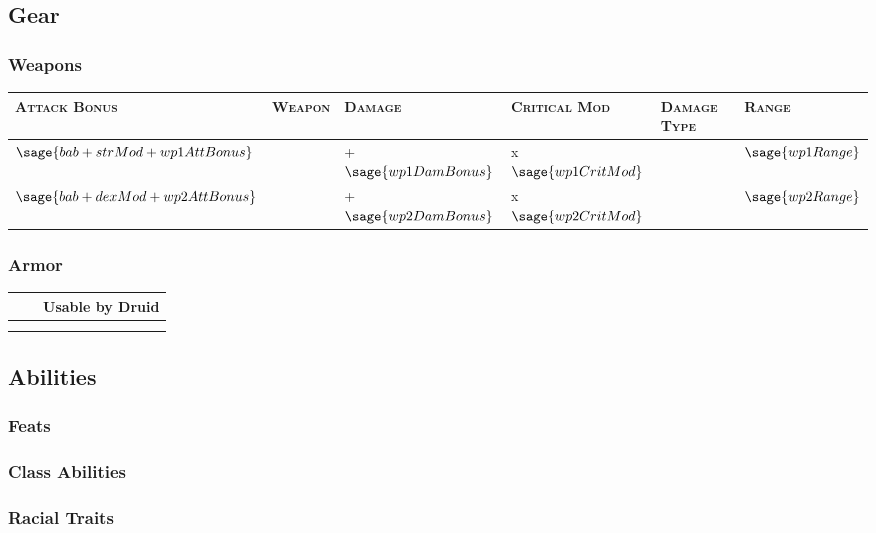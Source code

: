 \documentclass[10pt]{article}
\begin{document}
\subsection*{Gear}
	\subsubsection*{Weapons}
		\begin{tabularx}{\textwidth}{| X | X | X | X | X | X |}
			\hline
			\textsc{Attack Bonus} & \textsc{Weapon} & \textsc{Damage} & \textsc{Critical Mod} & \textsc{Damage Type} & \textsc{Range} \\ 
			\hline
			\(\sage{bab+strMod+wp1AttBonus}\) & \wpOneName & \wpOneDam+\(\sage{wp1DamBonus}\) & x\(\sage{wp1CritMod}\)  & \wpOneType & \(\sage{wp1Range}\) \\
			\hline
			\(\sage{bab+dexMod+wp2AttBonus}\) & \wpTwoName & \wpTwoDam+\(\sage{wp2DamBonus}\) & x\(\sage{wp2CritMod}\) & \wpTwoType & \(\sage{wp2Range}\) \\
			\hline
		\end{tabularx}
	\subsubsection*{Armor}
		\begin{tabularx}{\textwidth}{| X | X | X |}
			\hline
			\armOneName & \armOneBonus & Usable by Druid \\
			\hline
			\armTwoName & \armTwoBonus &\\
			\hline
			\armThreeName & \armThreeBonus &\\
			\hline
		\end{tabularx}
	


\subsection*{Abilities}
	\subsubsection*{Feats}
		\feats
	\subsubsection*{Class Abilities}
		\classab
	\subsubsection*{Racial Traits}
		\racetr
\end{document}
